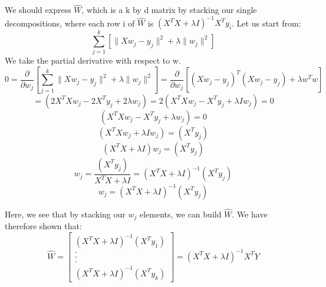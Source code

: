 \documentclass{article}
\begin{document}
\begin{aprob}
\begin{enumerate}
        We should express $\widehat{W}$, which is a k by d matrix by stacking our single decompositions, where each row i of $\widehat{W}$ is $(X^T X + \lambda I)^{-1} X^T y_i$. Let us start from: 
        \begin{equation}
        \sum_{j=1}^k \left[  \| X w_j - y_j\|^2 + \lambda \| w_j \|^2 \right]
        \end{equation}
        We take the partial derivative with respect to w. 
        \begin{equation}
        0 = \frac{\partial{}}{\partial{w_j}}\left[  \sum_{j=1}^k  \| X w_j - y_j\|^2 + \lambda \| w_j \|^2 \right] = \frac{\partial{}}{\partial{w_j}}\left[  (X w_j - y_j)^T (X w_j - y_j) + \lambda w^T w  \right]
        \end{equation}
        \begin{equation}
        =(2X^T Xw_j - 2 X^T y_j + 2 \lambda w_j) = 2 (X^T Xw_j - X^T y_j + \lambda I w_j) = 0
        \end{equation}
        \begin{equation}
        (X^T Xw_j - X^T y_j + \lambda w_j) = 0
        \end{equation}
        \begin{equation}
        (X^T Xw_j + \lambda I w_j) = (X^T y_j)
        \end{equation}
        \begin{equation}
        (X^T X + \lambda I)w_j =(X^T y_j)
        \end{equation}
        \begin{equation}
         w_j = \frac{(X^T y_j)}{X^T X + \lambda I} = (X^T X + \lambda I)^{-1} (X^T y_j)
        \end{equation}
        \begin{equation}
        w_j = (X^T X + \lambda I)^{-1}(X^T y_j)
        \end{equation}
        
        Here, we see that by stacking our $w_j$ elements, we can build $\widehat{W}$. We have therefore shown that:
        \begin{equation}
        \widehat{W} = \begin{bmatrix} (X^T X + \lambda I )^{-1}(X^T y_1) \\ . \\ . \\ . \\ (X^T X + \lambda I)^{-1}(X^T y_k) \end{bmatrix} = (X^T X + \lambda I)^{-1} X^T Y
        \end{equation}


\end{enumerate}
\end{aprob}
\end{document}
